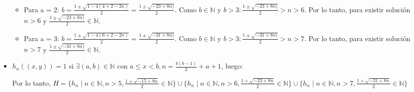 \documentclass{article}
\begin{document}
\begin{itemize}
\begin{itemize}
        \item Para a = 2: \(b = \frac{1\pm\sqrt{1-4(4+2-2n)}}{2} = \frac{1\pm\sqrt{-23+8n)}}{2}\). Como \(b \in \mathbb N\) y \(b > 3:\frac{1\pm\sqrt{-23+8n)}}{2} > n > 6\). Por lo tanto, para existir solución \(n > 6\) y \(\frac{1\pm\sqrt{-23+8n)}}{2} \in \mathbb N\).
        \item Para a = 3: \(b = \frac{1\pm\sqrt{1-4(6+2-2n)}}{2} = \frac{1\pm\sqrt{-31+8n)}}{2}\). Como \(b \in \mathbb N\) y \(b > 3:\frac{1\pm\sqrt{-31+8n)}}{2} > n > 7\). Por lo tanto, para existir solución \(n > 7\) y \(\frac{1\pm\sqrt{-31+8n)}}{2} \in \mathbb N\).
    \end{itemize}
    \item \(h_n ((x, y)) = 1\) si \(\exists(a, b) \in \mathbb N\) con \(a \leq x < b, n = \frac{b(b-1)}{2}+ a + 1\), luego:
\begin{center}
Por lo tanto, \(H = \{h_n \mid n \in \mathbb N, n > 5, \frac{1+\sqrt{-15+8n}}{2} \in \mathbb N\} \cup \{h_n \mid n \in \mathbb N, n > 6, \frac{1+\sqrt{-23+8n}}{2} \in \mathbb N\} \cup \{h_n \mid n \in \mathbb N, n > 7, \frac{1+\sqrt{-31+8n}}{2} \in \mathbb N\}
\)
\end{center}
\end{itemize}
\end{document}
